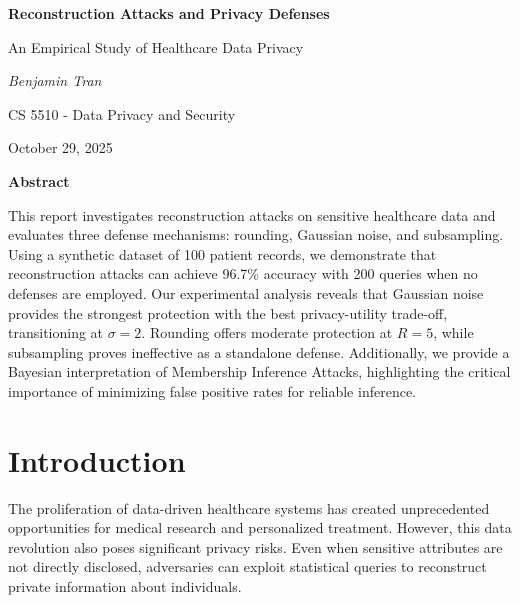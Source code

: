 \documentclass[11pt,letterpaper]{article}
\begin{document}
\begin{titlepage}
    \centering
    \vspace*{2cm}
    
    {\Huge\bfseries Reconstruction Attacks and Privacy Defenses\par}
    \vspace{0.5cm}
    {\Large An Empirical Study of Healthcare Data Privacy\par}
    \vspace{2cm}
    
    {\Large\itshape Benjamin Tran\par}
    \vspace{1cm}
    
    {\large CS 5510 - Data Privacy and Security\par}
    \vspace{0.5cm}
    {\large October 29, 2025\par}
    
    \vfill
    
    {\large \textbf{Abstract}\par}
    \vspace{0.5cm}
    \begin{minipage}{0.8\textwidth}
        \small
        This report investigates reconstruction attacks on sensitive healthcare data and evaluates three defense mechanisms: rounding, Gaussian noise, and subsampling. Using a synthetic dataset of 100 patient records, we demonstrate that reconstruction attacks can achieve 96.7\% accuracy with 200 queries when no defenses are employed. Our experimental analysis reveals that Gaussian noise provides the strongest protection with the best privacy-utility trade-off, transitioning at $\sigma = 2$. Rounding offers moderate protection at $R = 5$, while subsampling proves ineffective as a standalone defense. Additionally, we provide a Bayesian interpretation of Membership Inference Attacks, highlighting the critical importance of minimizing false positive rates for reliable inference.
    \end{minipage}
    
    \vfill
\end{titlepage}

\tableofcontents
\newpage

\section{Introduction}

The proliferation of data-driven healthcare systems has created unprecedented opportunities for medical research and personalized treatment. However, this data revolution also poses significant privacy risks. Even when sensitive attributes are not directly disclosed, adversaries can exploit statistical queries to reconstruct private information about individuals.
\end{document}
